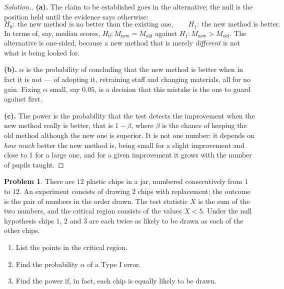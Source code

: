 \documentclass[11pt,a4paper]{article}
\theoremstyle{definition}
\newtheorem{problemx}{Problem}[section]
\newenvironment{problem}{\begin{problemx}}{\end{problemx}}
\newenvironment{solution}
  {\renewcommand{\qedsymbol}{}\begin{proof}[\textit{Solution}.]}
  {\end{proof}}
\begin{document}
\begin{solution}
\textbf{(a).} The claim to be established goes in the alternative; the null is the
position held until the evidence says otherwise:
\[H_0:\ \text{the new method is no better than the existing one},\qquad
H_1:\ \text{the new method is better.}\]
In terms of, say, median scores, $H_0: M_{\text{new}} = M_{\text{old}}$ against
$H_1: M_{\text{new}} > M_{\text{old}}$. The alternative is one-sided, because a new method
that is merely \emph{different} is not what is being looked for.

\textbf{(b).} $\alpha$ is the probability of concluding that the new method is better
when in fact it is not --- of adopting it, retraining staff and changing materials, all
for no gain. Fixing $\alpha$ small, say $0.05$, is a decision that this mistake is the one
to guard against first.

\textbf{(c).} The power is the probability that the test detects the improvement when
the new method really is better, that is $1-\beta$, where $\beta$ is the chance of
keeping the old method although the new one is superior. It is not one number: it
depends on \emph{how much} better the new method is, being small for a slight
improvement and close to 1 for a large one, and for a given improvement it grows with
the number of pupils taught.
\end{solution}

\begin{problem}
There are $12$ plastic chips in a jar, numbered consecutively from $1$ to $12$. An
experiment consists of drawing $2$ chips with replacement; the outcome is the pair of
numbers in the order drawn. The test statistic $X$ is the sum of the two numbers, and
the critical region consists of the values $X<5$. Under the null hypothesis chips $1$,
$2$ and $3$ are each twice as likely to be drawn as each of the other chips.
\begin{enumerate}
\item[(a).] List the points in the critical region.
\item[(b).] Find the probability $\alpha$ of a Type I error.
\item[(c).] Find the power if, in fact, each chip is equally likely to be drawn.
\end{enumerate}
\end{problem}
\end{document}
